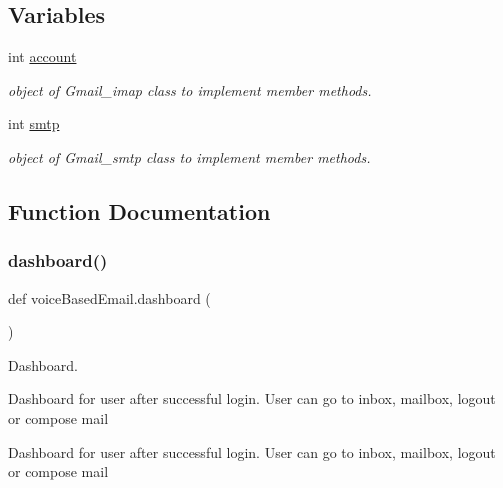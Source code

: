 \subsection*{Variables}
\begin{DoxyCompactItemize}
\item 
int \hyperlink{namespacevoiceBasedEmail_a027c09bdec7448ff2e44fe874dbde271}{account}
\begin{DoxyCompactList}\small\item\em object of Gmail\+\_\+imap class to implement member methods. \end{DoxyCompactList}\item 
int \hyperlink{namespacevoiceBasedEmail_ab69ec372b938baefc499493e55bb19ad}{smtp}
\begin{DoxyCompactList}\small\item\em object of Gmail\+\_\+smtp class to implement member methods. \end{DoxyCompactList}\end{DoxyCompactItemize}


\subsection{Function Documentation}
\mbox{\label{namespacevoiceBasedEmail_a78909b6db7071b2cbe1e43461c83290f}} 
\subsubsection{\texorpdfstring{dashboard()}{dashboard()}}
{\footnotesize\ttfamily def voice\+Based\+Email.\+dashboard (\begin{DoxyParamCaption}{ }\end{DoxyParamCaption})}



Dashboard. 

Dashboard for user after successful login. User can go to inbox, mailbox, logout or compose mail\begin{DoxyVerb}Dashboard for user after successful login. User can go to inbox, mailbox, logout or compose mail \end{DoxyVerb}
 \mbox{\label{namespacevoiceBasedEmail_a50a8c6217718182113988136063f0b02}} 
